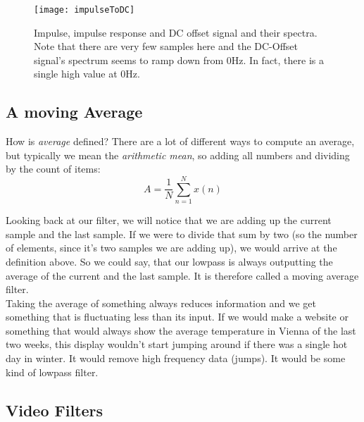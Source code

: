\begin{figure}[H]
	\centering
	\texttt{[image: impulseToDC]}
	\caption[Spectrum Impulse, Lowpass, DC]
	{Impulse, impulse response and DC offset signal and their spectra. Note that there are very few samples here and the DC-Offset signal's spectrum seems to ramp down from 0Hz. In fact, there is a single high value at 0Hz.}
	\label{fig:impToDc}
\end{figure}

\subsection{A moving Average}
How is \textit{average} defined? There are a lot of different ways to compute an average, but typically we mean the \textit{arithmetic mean}, so adding all numbers and dividing by the count of items:
\begin{equation}
	A = \frac{1}{N} \sum_{n=1}^N x(n)
\end{equation}

Looking back at our filter, we will notice that we are adding up the current sample and the last sample. If we were to divide that sum by two (so the number of elements, since it's two samples we are adding up), we would arrive at the definition above. So we could say, that our lowpass is always outputting the average of the current and the last sample. It is therefore called a moving average filter. \\
Taking the average of something always reduces information and we get something that is fluctuating less than its input. If we would make a website or something that would always show the average temperature in Vienna of the last two weeks, this display wouldn't start jumping around if there was a single hot day in winter. It would remove high frequency data (jumps). It would be some kind of lowpass filter.

\subsection{Video Filters}




